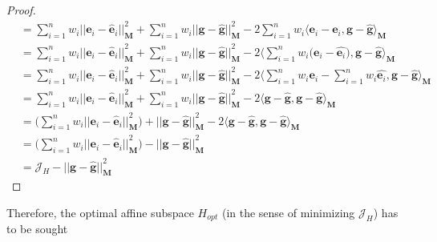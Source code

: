 \begin{notechapter}
\begin{proof}
\begin{align*}
        &=
        \displaystyle\sum_{i=1}^{n} w_{i} \big| \big| {\textbf{e}_i - \hat{\textbf{e}}_i \big| \big|}_{\mathbf{M}}^2 + 
        \displaystyle\sum_{i=1}^{n} w_{i} \big| \big| {\textbf{g} - \hat{\textbf{g}} \big| \big|}_{\mathbf{M}}^2 - 2
        \displaystyle\sum_{i=1}^{n} w_{i} \langle \mathbf{e}_{i} - \hat{\mathbf{e}_{i}}, \mathbf{g} - \hat{\mathbf{g}} \rangle_{\textbf{M}}\\
        &=
        \displaystyle\sum_{i=1}^{n} w_{i} \big| \big| {\textbf{e}_i - \hat{\textbf{e}}_i \big| \big|}_{\mathbf{M}}^2 + 
        \displaystyle\sum_{i=1}^{n} w_{i} \big| \big| {\textbf{g} - \hat{\textbf{g}} \big| \big|}_{\mathbf{M}}^2 - 2
        \langle \displaystyle\sum_{i=1}^{n} w_{i} \big( \mathbf{e}_{i} - \hat{\mathbf{e}_{i}} \big), \mathbf{g} - \hat{\mathbf{g}} \rangle_{\textbf{M}}\\
        &=
        \displaystyle\sum_{i=1}^{n} w_{i} \big| \big| {\textbf{e}_i - \hat{\textbf{e}}_i \big| \big|}_{\mathbf{M}}^2 + 
        \displaystyle\sum_{i=1}^{n} w_{i} \big| \big| {\textbf{g} - \hat{\textbf{g}} \big| \big|}_{\mathbf{M}}^2 - 2
        \langle \displaystyle\sum_{i=1}^{n} w_{i} \mathbf{e}_{i} - \displaystyle\sum_{i=1}^{n} w_{i}\hat{\mathbf{e}_{i}}, \mathbf{g} - \hat{\mathbf{g}} \rangle_{\textbf{M}}\\
        &=
        \displaystyle\sum_{i=1}^{n} w_{i} \big| \big| {\textbf{e}_i - \hat{\textbf{e}}_i \big| \big|}_{\mathbf{M}}^2 + 
        \displaystyle\sum_{i=1}^{n} w_{i} \big| \big| {\textbf{g} - \hat{\textbf{g}} \big| \big|}_{\mathbf{M}}^2 - 2
        \langle \mathbf{g} - \hat{\mathbf{g}}, \mathbf{g} - \hat{\mathbf{g}} \rangle_{\textbf{M}}\\
        &=
        \bigg(\displaystyle\sum_{i=1}^{n} w_{i} \big| \big| {\textbf{e}_i - \hat{\textbf{e}}_i \big| \big|}_{\mathbf{M}}^2 \bigg) + 
        \big| \big| {\textbf{g} - \hat{\textbf{g}} \big| \big|}_{\mathbf{M}}^2 - 2
        \langle \mathbf{g} - \hat{\mathbf{g}}, \mathbf{g} - \hat{\mathbf{g}} \rangle_{\textbf{M}}\\
        &=
        \bigg(\displaystyle\sum_{i=1}^{n} w_{i} \big| \big| {\textbf{e}_i - \hat{\textbf{e}}_i \big| \big|}_{\mathbf{M}}^2 \bigg) -
        \big| \big| {\textbf{g} - \hat{\textbf{g}} \big| \big|}_{\mathbf{M}}^2\\
        &=
        \mathcal{J}_{H} - \big| \big| {\textbf{g} - \hat{\textbf{g}} \big| \big|}_{\mathbf{M}}^2
   \end{align*}
\end{proof}
%
Therefore, the optimal affine subspace $H_{opt}$ (in the sense of minimizing $\mathcal{J}_{H}$) has to be sought

\end{notechapter}
